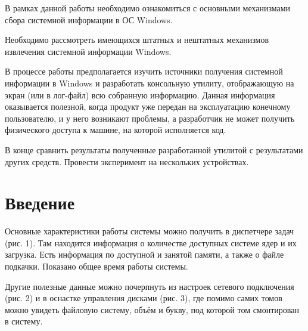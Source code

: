 \documentclass[a4paper, 12pt]{report}		%
\begin{document}
\vspace{1em}

В рамках данной работы необходимо ознакомиться с основными механизмами сбора системной информации в ОС Windows.
\vspace{1em}

Необходимо рассмотреть имеющихся штатных и нештатных механизмов извлечения системной информации Windows. 
\vspace{1em}

В процессе работы предполагается изучить источники получения системной информации в Windows и разработать консольную утилиту, отображающую на экран (или в лог-файл) всю собранную информацию. Данная информация оказывается полезной, когда продукт уже передан на эксплуатацию конечному пользователю, и у него возникают проблемы, а разработчик не может получить физического доступа к машине, на которой исполняется код.
\vspace{1em}

В конце сравнить результаты полученные разработанной утилитой с результатами других средств. Провести эксперимент на нескольких устройствах.


\chapter*{Введение}

Основные характеристики работы системы можно получить в диспетчере задач (рис. 1). Там находится информация о количестве доступных системе ядер и их загрузка. Есть информация по доступной и занятой памяти, а также о файле подкачки. Показано общее время работы системы.

Другие полезные данные можно почерпнуть из настроек сетевого подключения (рис. 2) и в оснастке управления дисками (рис. 3), где помимо самих томов можно увидеть файловую систему, объём и букву, под которой том смонтирован в систему.
\end{document}
